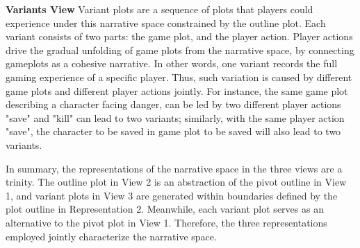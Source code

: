 
\noindent\textbf{Variants View} Variant plots are a sequence of plots that players could experience under this narrative space constrained by the outline plot. Each variant consists of two parts: the game plot, and the player action. Player actions drive the gradual unfolding of game plots from the narrative space, by connecting gameplots as a cohesive narrative. In other words, one variant records the full gaming experience of a specific player. Thus, such variation is caused by different game plots and different player actions jointly. For instance, the same game plot describing a character facing danger, can be led by two different player actions "save" and "kill" can lead to two variants; similarly, with the same player action "save", the character to be saved in game plot to be saved will also lead to two variants. 


In summary, the representations of the narrative space in the three views are a trinity. The outline plot in View 2 is an abstraction of the pivot outline in View 1, and variant plots in View 3 are generated within boundaries defined by the plot outline in Representation 2. Meanwhile, each variant plot serves as an alternative to the pivot plot in View 1. Therefore, the three representations employed jointly characterize the narrative space. 





